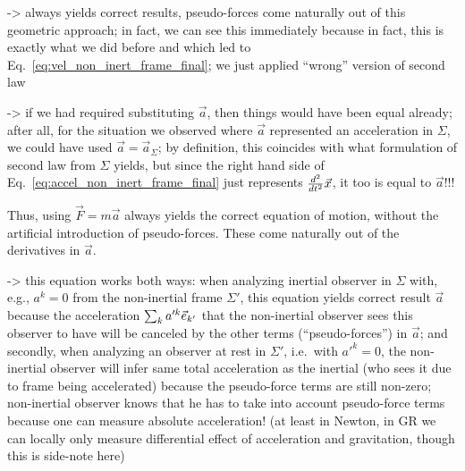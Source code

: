 \documentclass[../class_mech_main.tex]{subfiles}
\begin{document}
-> always yields correct results, pseudo-forces come naturally out of this geometric approach; in fact, we can see this immediately because in fact, this is exactly what we did before and which led to Eq.~\eqref{eq:vel_non_inert_frame_final}; we just applied \enquote{wrong} version of second law

-> if we had required substituting $\vec{a}$, then things would have been equal already; after all, for the situation we observed where $\vec{a}$ represented an acceleration in $\Sigma$, we could have used $\vec{a} = \vec{a}_\Sigma$; by definition, this coincides with what formulation of second law from $\Sigma$ yields, but since the right hand side of Eq.~\eqref{eq:accel_non_inert_frame_final} just represents $\dv[2]{t} \vec{x}$, it too is equal to $\vec{a}$!!!

Thus, using $\vec{F} = m \vec{a}$ always yields the correct equation of motion, without the artificial introduction of pseudo-forces. These come naturally out of the derivatives in $\vec{a}$.



-> this equation works both ways: when analyzing inertial observer in $\Sigma$ with, e.g., $a^k = 0$ from the non-inertial frame $\Sigma'$, this equation yields correct result $\vec{a}$ because the acceleration $\sum_k a'^k \vec{e}_{k'}$ that the non-inertial observer sees this observer to have will be canceled by the other terms (\enquote{pseudo-forces}) in $\vec{a}$; and secondly, when analyzing an observer at rest in $\Sigma'$, i.e.~with $a'^k = 0$, the non-inertial observer will infer same total acceleration as the inertial (who sees it due to frame being accelerated) because the pseudo-force terms are still non-zero; non-inertial observer knows that he has to take into account pseudo-force terms because one can measure absolute acceleration! (at least in Newton, in GR we can locally only measure differential effect of acceleration and gravitation, though this is side-note here)


\end{document}
